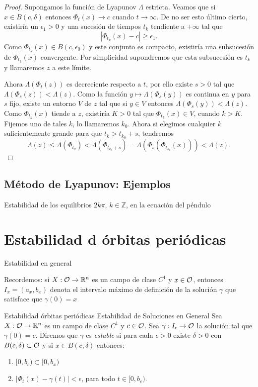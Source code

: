 \begin{proof}
 
Supongamos la función de Lyapunov $\Lambda$ estricta. Veamos que si $x\in B(c,\delta)$ entonces 
$\Phi_t(x)\to c$ cuando $t\to\infty$. De no ser esto último cierto, existiría un 
$\epsilon_1>0$ y una sucesión de tiempos $t_k$ tendiente a $+\infty$ tal que
\[
 |\Phi_{t_k}(x)-c|\geq \epsilon_1.
\]
Como $\Phi_{t_k}(x)\in \overline{B}(c,\epsilon_0)$ y este conjunto es compacto, existiría una subsucesión de $\Phi_{t_k}(x)$
convergente. Por simplicidad supondremos que esta subsucesión es $t_k$ y llamaremos $z$ a este límite. 

 
 
Ahora $\Lambda(\Phi_t(z))$ es decreciente respecto a $t$, por ello existe $s>0$ tal que $\Lambda(\Phi_s(z))<\Lambda(z)$. Como
la función $y \mapsto \Lambda(\Phi_s(y))$ es continua en $y$ para $s$ fijo, existe un entorno $V$ de $z$ tal que si 
$y\in V$ entonces $\Lambda(\Phi_s(y))<\Lambda(z)$. Como  $\Phi_{t_k}(x)$ tiende a $z$, existiría $K>0$ tal que 
$\Phi_{t_k}(x)\in V$, cuando $k>K$. Fijemos uno de tales $k$, lo llamaremos $k_0$. Ahora si elegimos cualquier $k$
suficientemente grande para que $t_k>t_{k_0}+s$, tendremos
\[\Lambda(z)\leq \Lambda(\Phi_{t_k})<\Lambda(\Phi_{t_{k_0}+s})=\Lambda(\Phi_s(\Phi_{t_{k_0}}(x)))<\Lambda(z).\]


\end{proof}




\subsection{Método de Lyapunov: Ejemplos}

\begin{ejemplo} Estabilidad de los equilibrios $2k\pi$, $k\in\mathbb{Z}$, en la ecuación del péndulo


\end{ejemplo}
 





\section{Estabilidad d órbitas periódicas}
{Estabilidad en general}
 
 Recordemos: si $X:\mathcal{O}\to\mathbb{R}^n$ es un campo de clase $C^1$ y  $x\in\mathcal{O}$, entonces $I_x=(a_x,b_x)$ denota el intervalo máximo
 de definición de la solución $\gamma$ que satisface que $\gamma(0)=x$




{Estabilidad órbitas periódicas}
 {Estabilidad de Soluciones en General}
 Sea $X:\mathcal{O}\to\mathbb{R}^n$ es un campo de clase $C^1$ y  $c\in\mathcal{O}$. Sea $\gamma:I_c\to\mathcal{O}$ la solución tal que 
 $\gamma(0)=c$. Diremos que $\gamma$ es \emph{estable} si para cada $\epsilon>0$ existe $\delta>0$ con 
 $B(c,\delta)\subset\mathcal{O}$ y si $x\in B(c,\delta)$ entonces:
 \begin{enumerate}
  \item $[0,b_c)\subset [0,b_x)$
  \item $|\Phi_t(x)-\gamma(t)|<\epsilon$, para todo $t\in[0,b_c)$. 
 \end{enumerate}
 
